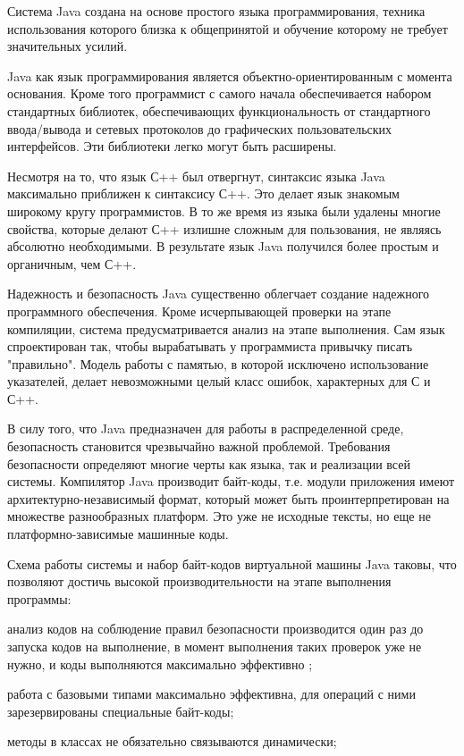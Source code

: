 Система Java создана на основе простого языка программирования, техника использования которого близка к общепринятой и обучение которому не требует значительных усилий.

Java как язык программирования является объектно-ориентированным с момента основания. Кроме того программист с самого начала обеспечивается набором стандартных библиотек, обеспечивающих функциональность от стандартного ввода/вывода и сетевых протоколов до графических пользовательских интерфейсов. Эти библиотеки легко могут быть расширены.

Несмотря на то, что язык С++ был отвергнут, синтаксис языка Java максимально приближен к синтаксису С++. Это делает язык знакомым широкому кругу программистов. В то же время из языка были удалены многие свойства, которые делают С++ излишне сложным для пользования, не являясь абсолютно необходимыми. В результате язык Java получился более простым и органичным, чем С++.

Надежность и безопасность Java существенно облегчает создание надежного программного обеспечения. Кроме исчерпывающей проверки на этапе компиляции, система предусматривается анализ на этапе выполнения. Сам язык спроектирован так, чтобы вырабатывать у программиста привычку писать "правильно". Модель работы с памятью, в которой исключено использование указателей, делает невозможными целый класс ошибок, характерных для С и С++.

В силу того, что Java предназначен для работы в распределенной среде, безопасность становится чрезвычайно важной проблемой. Требования безопасности определяют многие черты как языка, так и реализации всей системы.
Компилятор Java производит байт-коды, т.е. модули приложения имеют архитектурно-независимый формат, который может быть проинтерпретирован на множестве разнообразных платформ. Это уже не исходные тексты, но еще не платформно-зависимые машинные коды.

Схема работы системы и набор байт-кодов виртуальной машины Java таковы, что позволяют достичь высокой производительности на этапе выполнения программы:

анализ кодов на соблюдение правил безопасности производится один раз до запуска кодов на выполнение, в момент выполнения таких проверок уже не нужно, и коды выполняются максимально эффективно ;

работа с базовыми типами максимально эффективна, для операций с ними зарезервированы специальные байт-коды;

методы в классах не обязательно связываются динамически;

